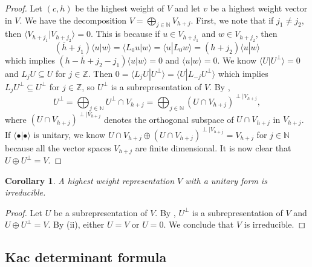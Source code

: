 \documentclass[a4paper, 12pt, reqno]{amsart}
\newtheorem{corollary}[theorem]{Corollary}
\theoremstyle{remark}
\numberwithin{equation}{subsection}
\begin{document}
\begin{proof}
  Let $(c, h)$ be the highest weight of $V$ and let $v$ be a highest weight vector in $V$.
  We have the decomposition $V = \bigoplus_{j \in \mathbb{N}}V_{h + j}$.
  First, we note that if $j_1 \neq j_2$, then $\langle V_{h + j_1}| V_{h + j_2}\rangle = 0$.
  This is because if $u \in V_{h + j_1}$ and $w \in V_{h + j_2}$, then
  \begin{equation*}
    (\overline{h} + j_1)\langle u| w\rangle = \langle L_0u| w\rangle = \langle u| L_0w\rangle = (h + j_2)\langle u| w\rangle
  \end{equation*}
  which implies $(h - \overline{h} + j_2 - j_1)\langle u| w\rangle = 0$ and $\langle u| w\rangle = 0$.
  We know $\langle U| U^{\perp}\rangle = 0$ and $L_jU \subseteq U$ for $j \in \mathbb{Z}$.
  Then $0 = \langle L_jU| U^{\perp}\rangle = \langle U| L_{-j}U^{\perp}\rangle$ which implies $L_jU^{\perp} \subseteq U^{\perp}$ for $j \in \mathbb{Z}$, so $U^{\perp}$ is a subrepresentation of $V$.
  By ,
  \begin{equation*}
     U^{\perp} = \bigoplus_{j \in \mathbb{N}}U^{\perp} \cap V_{h + j} = \bigoplus_{j \in \mathbb{N}}(U \cap V_{h + j})^{\perp|V_{h + j}},
  \end{equation*}
  where $(U \cap V_{h + j})^{\perp|V_{h + j}}$ denotes the orthogonal subspace of $U \cap V_{h + j}$ in $V_{h + j}$.
  If $\langle \bullet| \bullet\rangle$ is unitary, we know $U \cap V_{h + j} \oplus (U \cap V_{h + j})^{\perp|V_{h + j}} = V_{h + j}$ for $j \in \mathbb{N}$ because all the vector spaces $V_{h + j}$ are finite dimensional.
  It is now clear that $U \oplus U^{\perp} = V$.
\end{proof}

\begin{corollary}
  \label{crl:3}
  A highest weight representation $V$ with a unitary form is irreducible.
\end{corollary}

\begin{proof}
  Let $U$ be a subrepresentation of $V$.
  By , $U^{\perp}$ is a subrepresentation of $V$ and $U\oplus U^{\perp} = V$.
  By (ii), either $U = V$ or $U = 0$.
  We conclude that $V$ is irreducible.
\end{proof}

\subsection{Kac determinant formula}
\label{sec:kac-dete-form}
\end{document}

